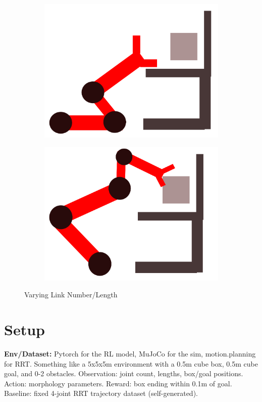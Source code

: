 \documentclass[10pt]{article}
\begin{document}
\begin{figure}[H]
  \centering
  \begin{subfigure}[b]{0.45\textwidth}
    \centering
    \includegraphics[width=\textwidth]{3link.png}
  \end{subfigure}
  \hfill
  \begin{subfigure}[b]{0.45\textwidth}
    \centering
    \includegraphics[width=\textwidth]{4link.png}
  \end{subfigure}
  \caption{Varying Link Number/Length}
  \label{fig:varyManFigure}
\end{figure}

\vspace{-5pt}
\section*{Setup}
\textbf{Env/Dataset:} Pytorch for the RL model, MuJoCo for the sim, motion.planning for RRT.
Something like a 5x5x5m environment with a 0.5m cube box, 0.5m cube goal, and 0-2 obstacles.
Observation: joint count, lengths, box/goal positions.
Action: morphology parameters.
Reward: box ending within 0.1m of goal.
Baseline: fixed 4-joint RRT trajectory dataset (self-generated).
\end{document}

